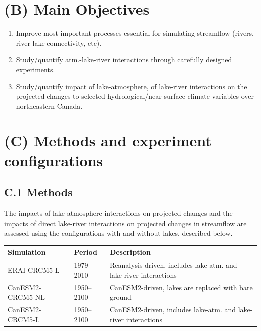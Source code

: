 \documentclass[a0,landscape]{a0poster}
\begin{document}
\begin{multicols}{3}

\color{DarkSlateGray} %

\section*{(B) Main Objectives}

\begin{enumerate}
\item Improve most important processes essential for simulating streamflow (rivers, river-lake connectivity, etc).
\item Study/quantify atm.-lake-river interactions through carefully designed experiments.
\item Study/quantify impact of lake-atmosphere, of lake-river interactions on the projected changes to selected hydrological/near-surface climate variables over northeastern Canada.
\end{enumerate}


\section*{(C) Methods and experiment configurations}
\subsection*{C.1 Methods}
%
The impacts of lake-atmosphere interactions on
projected changes and the impacts of direct lake-river interactions on projected
changes in streamflow are assessed using the configurations with and without
lakes, described below.\\[0.5cm]

\begin{minipage}[t]{\linewidth}
\center
\small
\begin{tabular}{lll}
\toprule
\textbf{Simulation} & \textbf{Period} & \textbf{Description}\\
\midrule
ERAI-CRCM5-L     & 1979--2010 & Reanalysis-driven, includes lake-atm. and lake-river interactions\\
CanESM2-CRCM5-NL & 1950--2100 & CanESM2-driven, lakes are replaced with bare ground \\
CanESM2-CRCM5-L  & 1950--2100 & CanESM2-driven, includes lake-atm. and lake-river interactions \\
\bottomrule
\end{tabular}
\end{minipage}


\end{multicols}
\end{document}
